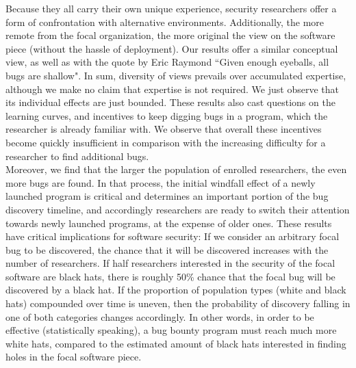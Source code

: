Because they all carry their own unique experience, security researchers offer a form of confrontation with alternative environments. Additionally, the more remote from the focal organization, the more original the view on the software piece (without the hassle of deployment). Our results offer a similar conceptual view, as well as with the quote by Eric Raymond ``Given enough eyeballs, all bugs are shallow". In sum, diversity of views prevails over accumulated expertise, although we make no claim that expertise is not required. We just observe that its individual effects are just bounded. These results also cast questions on the learning curves, and incentives to keep digging bugs in a program, which the researcher is already familiar with. We observe that overall these incentives become quickly insufficient in comparison with the increasing difficulty for a researcher to find additional bugs.\\

Moreover, we find that the larger the population of enrolled researchers, the even more bugs are found. In that process, the initial windfall effect of a newly launched program is critical and determines an important portion of the bug discovery timeline, and accordingly researchers are ready to switch their attention towards newly launched programs, at the expense of older ones. These results have critical implications for software security: If we consider an arbitrary focal bug to be discovered, the chance that it will be discovered increases with the number of researchers. If half researchers interested in the security of the focal software are black hats, there is roughly 50\% chance that the focal bug will be discovered by a black hat. If the proportion of population types (white and black hats) compounded over time is uneven, then the probability of discovery falling in one of both categories changes accordingly. In other words, in order to be effective (statistically speaking), a bug bounty program must reach much more white hats, compared to the estimated amount of black hats interested in finding holes in the focal software piece.\\


